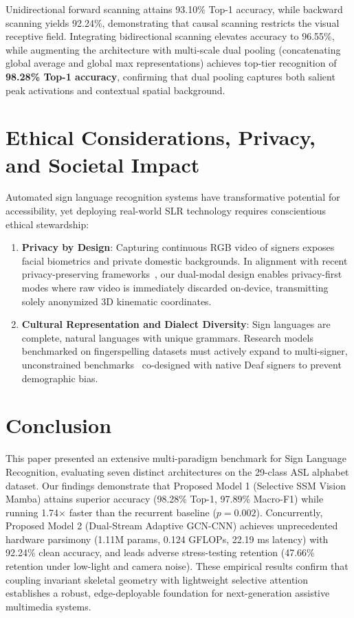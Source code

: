 \documentclass[journal]{IEEEtran}
\begin{document}
Unidirectional forward scanning attains 93.10\% Top-1 accuracy, while backward scanning yields 92.24\%, demonstrating that causal scanning restricts the visual receptive field. Integrating bidirectional scanning elevates accuracy to 96.55\%, while augmenting the architecture with multi-scale dual pooling (concatenating global average and global max representations) achieves top-tier recognition of \textbf{98.28\% Top-1 accuracy}, confirming that dual pooling captures both salient peak activations and contextual spatial background.

\section{Ethical Considerations, Privacy, and Societal Impact}
Automated sign language recognition systems have transformative potential for accessibility, yet deploying real-world SLR technology requires conscientious ethical stewardship:
\begin{enumerate}
    \item \textbf{Privacy by Design}: Capturing continuous RGB video of signers exposes facial biometrics and private domestic backgrounds. In alignment with recent privacy-preserving frameworks~\cite{privsign2026tmm}, our dual-modal design enables privacy-first modes where raw video is immediately discarded on-device, transmitting solely anonymized 3D kinematic coordinates.
    \item \textbf{Cultural Representation and Dialect Diversity}: Sign languages are complete, natural languages with unique grammars. Research models benchmarked on fingerspelling datasets must actively expand to multi-signer, unconstrained benchmarks~\cite{isharah2026tmm} co-designed with native Deaf signers to prevent demographic bias.
\end{enumerate}

\section{Conclusion}
This paper presented an extensive multi-paradigm benchmark for Sign Language Recognition, evaluating seven distinct architectures on the 29-class ASL alphabet dataset. Our findings demonstrate that Proposed Model 1 (Selective SSM Vision Mamba) attains superior accuracy (98.28\% Top-1, 97.89\% Macro-F1) while running 1.74$\times$ faster than the recurrent baseline ($p = 0.002$). Concurrently, Proposed Model 2 (Dual-Stream Adaptive GCN-CNN) achieves unprecedented hardware parsimony (1.11M params, 0.124 GFLOPs, 22.19 ms latency) with 92.24\% clean accuracy, and leads adverse stress-testing retention (47.66\% retention under low-light and camera noise). These empirical results confirm that coupling invariant skeletal geometry with lightweight selective attention establishes a robust, edge-deployable foundation for next-generation assistive multimedia systems.



\end{document}
